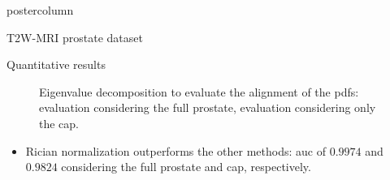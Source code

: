 \documentclass[final, size=a0]{beamer}
\begin{document}
\begin{frame}
\begin{columns}
\begin{column}{.33\textwidth}
\begin{beamercolorbox}[center,wd=\textwidth]{postercolumn}
\begin{minipage}[T]{.95\textwidth}
{\begin{block}{T2W-MRI prostate dataset}
            \end{block}

            \vspace{.2cm}

            \begin{block}{Quantitative results}
              \begin{figure}
                \centering
                \hfill
                \caption{Eigenvalue decomposition to evaluate the alignment of the \acs{pdf}s: \protect{} evaluation considering the full prostate, \protect{} evaluation considering only the \ac{cap}.}
                \label{fig:qt}
              \end{figure}
              
              \begin{itemize}
              \justifying
              \item Rician normalization outperforms the other methods: \ac{auc} of $0.9974$ and $0.9824$ considering the full prostate and \ac{cap}, respectively.
              \end{itemize}

            \end{block}
            
}
\end{minipage}
\end{beamercolorbox}
\end{column}
\end{columns}
\end{frame}
\end{document}
